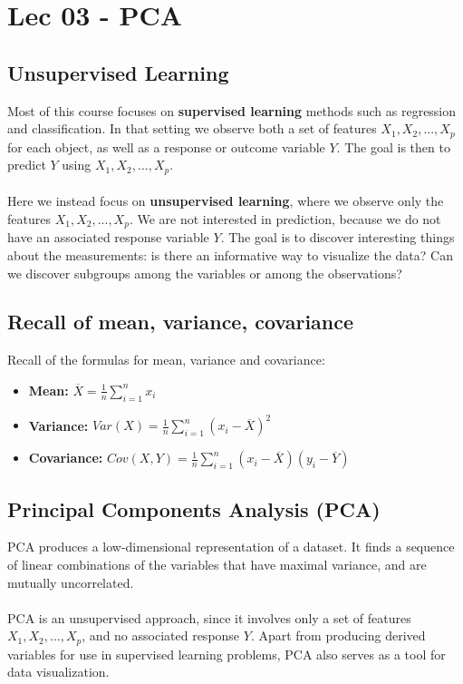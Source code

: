\chapter{Lec 03 - PCA}

\section{Unsupervised Learning}
Most of this course focuses on \textbf{supervised learning} methods such as regression and classification. In that setting we observe both a set of features $X_1, X_2, . . . , X_p$ for each object, as well as a response or
outcome variable $Y$. The goal is then to predict $Y$ using $X_1, X_2, . . . , X_p$.\\\\
Here we instead focus on \textbf{unsupervised learning}, where we observe only the features $X_1, X_2, . . . , X_p$. We are not interested in prediction, because we do not have an associated response variable $Y$. The goal is to discover interesting things about the measurements: is there an informative way to visualize the data? Can we discover subgroups among the variables or among the observations?

\section{Recall of mean, variance, covariance}
Recall of the formulas for mean, variance and covariance:
\begin{itemize}
    \item \textbf{Mean:} $\overline{X} = \frac{1}{n}\sum_{i=1}^n x_i$

    \item \textbf{Variance:} $Var(X) = \frac{1}{n}\sum_{i=1}^n (x_i - \overline{X})^2$

    \item \textbf{Covariance:} $Cov(X,Y) = \frac{1}{n}\sum_{i=1}^n (x_i - \overline{X})(y_i - \overline{Y})$
\end{itemize}

\section{Principal Components Analysis (PCA)}
PCA produces a low-dimensional representation of a dataset. It finds a sequence of linear combinations of the variables that have maximal variance, and are mutually uncorrelated.
\\\\
PCA is an unsupervised approach, since it involves only a set of features $X_1, X_2,...,X_p$, and no associated response $Y$. Apart from producing derived variables for use in supervised learning problems, PCA also serves as a tool for data visualization.

